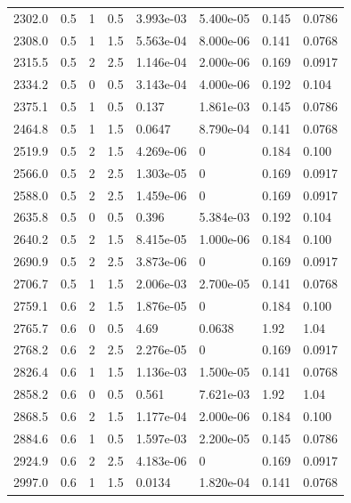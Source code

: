 \documentclass[preview]{standalone}
\begin{document}
{{{\begin{tabular}{L{1.2cm}C{1.2cm} C{0.3cm}C{0.5cm} C{1.4cm}C{1.4cm} C{1.4cm}C{1.4cm}}
  2302.0  &   0.5  & 1     & 0.5 &  3.993e-03  & 5.400e-05  & 0.145 &  0.0786   \\ 
  2308.0  &   0.5  & 1     & 1.5 &  5.563e-04  & 8.000e-06  & 0.141 &  0.0768   \\ 
  2315.5  &   0.5  & 2     & 2.5 &  1.146e-04  & 2.000e-06  & 0.169 &  0.0917   \\ 
  2334.2  &   0.5  & 0     & 0.5 &  3.143e-04  & 4.000e-06  & 0.192 &  0.104   \\ 
  2375.1  &   0.5  & 1     & 0.5 &  0.137  & 1.861e-03  & 0.145 &  0.0786   \\ 
  2464.8  &   0.5  & 1     & 1.5 &  0.0647  & 8.790e-04  & 0.141 &  0.0768   \\ 
  2519.9  &   0.5  & 2     & 1.5 &  4.269e-06  & 0  & 0.184 &  0.100   \\ 
  2566.0  &   0.5  & 2     & 2.5 &  1.303e-05  & 0  & 0.169 &  0.0917   \\ 
  2588.0  &   0.5  & 2     & 2.5 &  1.459e-06  & 0  & 0.169 &  0.0917   \\ 
  2635.8  &   0.5  & 0     & 0.5 &  0.396  & 5.384e-03  & 0.192 &  0.104   \\ 
  2640.2  &   0.5  & 2     & 1.5 &  8.415e-05  & 1.000e-06  & 0.184 &  0.100   \\ 
  2690.9  &   0.5  & 2     & 2.5 &  3.873e-06  & 0  & 0.169 &  0.0917   \\ 
  2706.7  &   0.5  & 1     & 1.5 &  2.006e-03  & 2.700e-05  & 0.141 &  0.0768   \\ 
  2759.1  &   0.6  & 2     & 1.5 &  1.876e-05  & 0  & 0.184 &  0.100   \\ 
  2765.7  &   0.6  & 0     & 0.5 &  4.69  & 0.0638  & 1.92 &  1.04   \\ 
  2768.2  &   0.6  & 2     & 2.5 &  2.276e-05  & 0  & 0.169 &  0.0917   \\ 
  2826.4  &   0.6  & 1     & 1.5 &  1.136e-03  & 1.500e-05  & 0.141 &  0.0768   \\ 
  2858.2  &   0.6  & 0     & 0.5 &  0.561  & 7.621e-03  & 1.92 &  1.04   \\ 
  2868.5  &   0.6  & 2     & 1.5 &  1.177e-04  & 2.000e-06  & 0.184 &  0.100   \\ 
  2884.6  &   0.6  & 1     & 0.5 &  1.597e-03  & 2.200e-05  & 0.145 &  0.0786   \\ 
  2924.9  &   0.6  & 2     & 2.5 &  4.183e-06  & 0  & 0.169 &  0.0917   \\ 
  2997.0  &   0.6  & 1     & 1.5 &  0.0134  & 1.820e-04  & 0.141 &  0.0768   \\ 

\end{tabular}}}}
\end{document}
